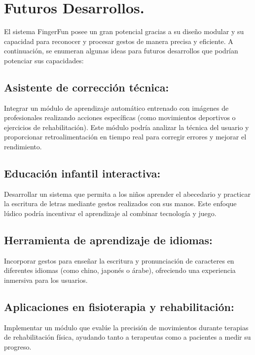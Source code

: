 \chapter{Futuros Desarrollos.}

El sistema FingerFun posee un gran potencial gracias a su diseño modular y su capacidad para reconocer y procesar gestos de manera precisa y eficiente. A continuación, se enumeran algunas ideas para futuros desarrollos que podrían potenciar sus capacidades:

\section{Asistente de corrección técnica:}

Integrar un módulo de aprendizaje automático entrenado con imágenes de profesionales realizando acciones específicas (como movimientos deportivos o ejercicios de rehabilitación). Este módulo podría analizar la técnica del usuario y proporcionar retroalimentación en tiempo real para corregir errores y mejorar el rendimiento.

\section{Educación infantil interactiva:}

Desarrollar un sistema que permita a los niños aprender el abecedario y practicar la escritura de letras mediante gestos realizados con sus manos. Este enfoque lúdico podría incentivar el aprendizaje al combinar tecnología y juego.

\section{Herramienta de aprendizaje de idiomas:}

Incorporar gestos para enseñar la escritura y pronunciación de caracteres en diferentes idiomas (como chino, japonés o árabe), ofreciendo una experiencia inmersiva para los usuarios.

\section{Aplicaciones en fisioterapia y rehabilitación:}

Implementar un módulo que evalúe la precisión de movimientos durante terapias de rehabilitación física, ayudando tanto a terapeutas como a pacientes a medir su progreso.


